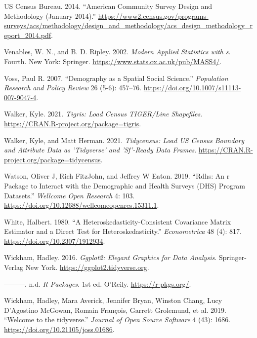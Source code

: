 \documentclass[
  letterpaper,
  DIV=11,
  numbers=noendperiod]{scrreprt}
\newlength{\cslhangindent}
\newlength{\cslentryspacingunit} %
\newenvironment{CSLReferences}[2] %
 {%
  \setlength{\parindent}{0pt}
  \ifodd #1
  \let\oldpar\par
  \def\par{\hangindent=\cslhangindent\oldpar}
  \fi
  \setlength{\parskip}{#2\cslentryspacingunit}
 }%
 {}
\begin{document}
\begin{CSLReferences}{1}{0}
\leavevmode{}%
US Census Bureau. 2014. {``American Community Survey Design and
Methodology (January 2014).''}
\url{https://www2.census.gov/programs-surveys/acs/methodology/design_and_methodology/acs_design_methodology_report_2014.pdf}.

\leavevmode{}%
Venables, W. N., and B. D. Ripley. 2002. \emph{Modern Applied Statistics
with s}. Fourth. New York: Springer.
\url{https://www.stats.ox.ac.uk/pub/MASS4/}.

\leavevmode{}%
Voss, Paul R. 2007. {``Demography as a {Spatial} {Social} {Science}.''}
\emph{Population Research and Policy Review} 26 (5-6): 457--76.
\url{https://doi.org/10.1007/s11113-007-9047-4}.

\leavevmode{}%
Walker, Kyle. 2021. \emph{Tigris: Load Census TIGER/Line Shapefiles}.
\url{https://CRAN.R-project.org/package=tigris}.

\leavevmode{}%
Walker, Kyle, and Matt Herman. 2021. \emph{Tidycensus: Load US Census
Boundary and Attribute Data as 'Tidyverse' and 'Sf'-Ready Data Frames}.
\url{https://CRAN.R-project.org/package=tidycensus}.

\leavevmode{}%
Watson, Oliver J, Rich FitzJohn, and Jeffrey W Eaton. 2019. {``Rdhs: An
r Package to Interact with the Demographic and Health Surveys (DHS)
Program Datasets.''} \emph{Wellcome Open Research} 4: 103.
\url{https://doi.org/10.12688/wellcomeopenres.15311.1}.

\leavevmode{}%
White, Halbert. 1980. {``A {Heteroskedasticity}-{Consistent}
{Covariance} {Matrix} {Estimator} and a {Direct} {Test} for
{Heteroskedasticity}.''} \emph{Econometrica} 48 (4): 817.
\url{https://doi.org/10.2307/1912934}.

\leavevmode{}%
Wickham, Hadley. 2016. \emph{Ggplot2: Elegant Graphics for Data
Analysis}. Springer-Verlag New York.
\url{https://ggplot2.tidyverse.org}.

\leavevmode{}%
---------. n.d. \emph{{R Packages}}. 1st ed. O'Reily.
\url{https://r-pkgs.org/}.

\leavevmode{}%
Wickham, Hadley, Mara Averick, Jennifer Bryan, Winston Chang, Lucy
D'Agostino McGowan, Romain François, Garrett Grolemund, et al. 2019.
{``Welcome to the {tidyverse}.''} \emph{Journal of Open Source Software}
4 (43): 1686. \url{https://doi.org/10.21105/joss.01686}.


\end{CSLReferences}
\end{document}
